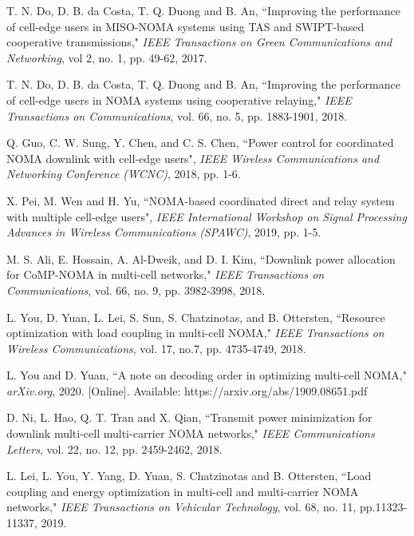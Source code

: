 \documentclass[10pt,journal,final,finalsubmission,twocolumn]{IEEEtran}
\begin{document}
\begin{thebibliography}{99}

  T. N. Do, D. B. da Costa, T. Q. Duong and B. An, ``Improving the performance of cell-edge users in MISO-NOMA systems using TAS and SWIPT-based cooperative transmissions," {\em IEEE Transactions on Green Communications and Networking}, vol 2, no. 1, pp. 49-62, 2017.

 T. N. Do, D. B. da Costa, T. Q. Duong and B. An, ``Improving the performance of cell-edge users in NOMA systems using cooperative relaying," {\em IEEE Transactions on Communications}, vol. 66, no. 5, pp. 1883-1901, 2018.

 Q. Guo, C. W. Sung, Y. Chen, and C. S. Chen, ``Power control for coordinated NOMA downlink with cell-edge users", {\em IEEE Wireless Communications and Networking Conference (WCNC)}, 2018, pp. 1-6.

 X. Pei, M. Wen and H. Yu, ``NOMA-based coordinated direct and relay system with multiple cell-edge users",  {\em IEEE International Workshop on Signal Processing Advances in Wireless Communications (SPAWC)}, 2019, pp. 1-5.

 M. S. Ali, E. Hossain, A. Al-Dweik, and D. I. Kim, ``Downlink power allocation for CoMP-NOMA in
multi-cell networks," {\em IEEE Transactions on Communications}, vol. 66, no. 9, pp. 3982-3998, 2018. 

 L. You, D. Yuan, L. Lei, S. Sun, S. Chatzinotas, and B. Ottersten, ``Resource optimization with load coupling in multi-cell NOMA," {\em IEEE Transactions on Wireless Communications}, vol. 17, no.7, pp. 4735-4749, 2018.

 L. You and D. Yuan, ``A note on decoding order in optimizing multi-cell NOMA," {\em arXiv.org}, 2020. [Online]. Available: https://arxiv.org/abs/1909.08651.pdf

 D. Ni, L. Hao, Q. T. Tran and X. Qian, ``Transmit power minimization for downlink multi-cell multi-carrier NOMA networks," {\em IEEE Communications Letters}, vol. 22, no. 12, pp. 2459-2462, 2018.

 L. Lei, L. You, Y. Yang, D. Yuan, S. Chatzinotas and B. Ottersten, ``Load coupling and energy optimization in multi-cell and multi-carrier NOMA networks," {\em  IEEE Transactions on Vehicular Technology}, vol. 68, no. 11, pp.11323-11337, 2019.


\end{thebibliography}
\end{document}
